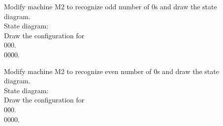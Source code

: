 \documentclass[12pt]{article}
\begin{document}
Modify machine M2 to recognize odd number of 0s and draw the state \\
diagram. \\

State diagram: \\

Draw the configuration for \\
000. \\

0000. \\

\pagebreak

Modify machine M2 to recognize even number of 0s and draw the state \\
diagram. \\

State diagram: \\

Draw the configuration for \\
000. \\

0000. \\
\end{document}
